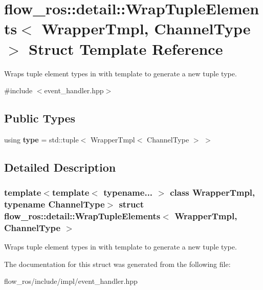 \hypertarget{structflow__ros_1_1detail_1_1_wrap_tuple_elements}{}\section{flow\+\_\+ros\+:\+:detail\+:\+:Wrap\+Tuple\+Elements$<$ Wrapper\+Tmpl, Channel\+Type $>$ Struct Template Reference}
\label{structflow__ros_1_1detail_1_1_wrap_tuple_elements}


Wraps tuple element types in with template to generate a new tuple type.  




{\ttfamily \#include $<$event\+\_\+handler.\+hpp$>$}

\subsection*{Public Types}
\begin{DoxyCompactItemize}
\item 
\mbox{\label{structflow__ros_1_1detail_1_1_wrap_tuple_elements_a1e7175caae34df8828f5ff605fa4cae2}} 
using {\bfseries type} = std\+::tuple$<$ Wrapper\+Tmpl$<$ Channel\+Type $>$ $>$
\end{DoxyCompactItemize}


\subsection{Detailed Description}
\subsubsection*{template$<$template$<$ typename... $>$ class Wrapper\+Tmpl, typename Channel\+Type$>$\newline
struct flow\+\_\+ros\+::detail\+::\+Wrap\+Tuple\+Elements$<$ Wrapper\+Tmpl, Channel\+Type $>$}

Wraps tuple element types in with template to generate a new tuple type. 

The documentation for this struct was generated from the following file\+:\begin{DoxyCompactItemize}
\item 
flow\+\_\+ros/include/impl/event\+\_\+handler.\+hpp\end{DoxyCompactItemize}

